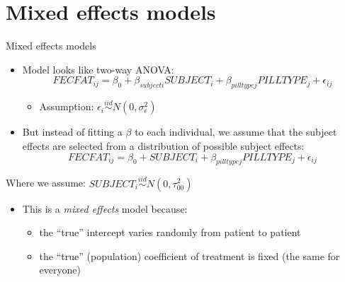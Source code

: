 \documentclass[
  ignorenonframetext,
]{beamer}
\providecommand{\tightlist}{%
  \setlength{\itemsep}{0pt}\setlength{\parskip}{0pt}}
\begin{document}
\hypertarget{mixed-effects-models}{%
\section{Mixed effects models}\label{mixed-effects-models}}

\begin{frame}{Mixed effects models}
\protect\hypertarget{mixed-effects-models-1}{}

\begin{itemize}
\tightlist
\item
  Model looks like two-way ANOVA: \[
  FECFAT_{ij} = \beta_0 + \beta_{subject i} SUBJECT_i + \beta_{pilltype j} PILLTYPE_j + \epsilon_{ij}
  \]

  \begin{itemize}
  \tightlist
  \item
    Assumption:
    \(\epsilon_i \stackrel{iid}{\sim} N(0, \sigma_\epsilon^2)\)
  \end{itemize}
\item
  But instead of fitting a \(\beta\) to each individual, we assume that
  the subject effects are selected from a distribution of possible
  subject effects: \[
  FECFAT_{ij} = \beta_0 + SUBJECT_i + \beta_{pilltype j} PILLTYPE_j + \epsilon_{ij}
  \]
\end{itemize}

Where we assume: \(SUBJECT_i \stackrel{iid}{\sim} N(0, \tau_{00}^2)\)

\begin{itemize}
\tightlist
\item
  This is a \emph{mixed effects} model because:

  \begin{itemize}
  \tightlist
  \item
    the ``true'' intercept varies randomly from patient to patient
  \item
    the ``true'' (population) coefficient of treatment is fixed (the
    same for everyone)
  \end{itemize}
\end{itemize}

\end{frame}
\end{document}
